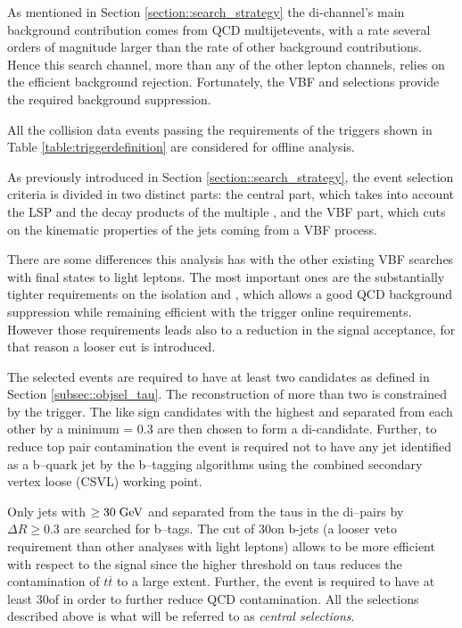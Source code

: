 As mentioned in Section \ref{section::search_strategy} the di-\hadtau channel's main background contribution comes from QCD multijetevents, with a rate several orders of magnitude larger than the rate of other background contributions. Hence this search channel, more than any of the other lepton channels, relies on the efficient background rejection. Fortunately, the VBF and \met selections provide the required background suppression.

All the collision data events passing the requirements of the triggers shown in Table \ref{table:triggerdefinition} are considered for offline analysis. 

As previously introduced in Section \ref{section::search_strategy}, the event selection criteria is divided in two distinct parts: the central part, which takes into account the LSP and the decay products of the multiple \hadtau, and the VBF part, which cuts on the kinematic properties of the jets coming from a VBF process. 

There are some differences this analysis has with the other existing VBF searches with final states to light leptons. The most important ones are the substantially tighter requirements on the \hadtau isolation and \pt, which allows a good QCD background suppression while remaining efficient with the trigger online requirements. However those requirements leads also to a reduction in the signal acceptance, for that reason a looser \met cut is introduced.

The selected events are required to have at least two \hadtau candidates as defined in Section \ref{subsec::objsel_tau}. The reconstruction of more than two \hadtau is constrained by the trigger. The like sign \hadtau candidates with the highest \pt and separated from each other by a minimum \deltar = 0.3 are then chosen to form a di-\hadtau candidate. 
Further, to reduce top pair contamination the event is required not to have any jet identified as a b--quark jet by the b--tagging algorithms using the {\textit combined secondary vertex loose} (CSVL) working point. 

Only jets with \pt $\ge 30\;\text{Ge}\kern-0.06667em\text{V}$ and separated from the taus in the di--\hadtau pairs by $\Delta R \ge 0.3$ are searched for b--tags. The \pt cut of 30\gev on b-jets (a looser veto requirement than other analyses with light leptons) allows to be more efficient with respect to the signal since the higher \pt threshold on taus reduces the contamination of $t\overline{t}$ to a large extent. Further, the event is required to have at least 30\gev of \met in order to further reduce QCD contamination. All the selections described above is what will be referred to as \textit{central selections}.

